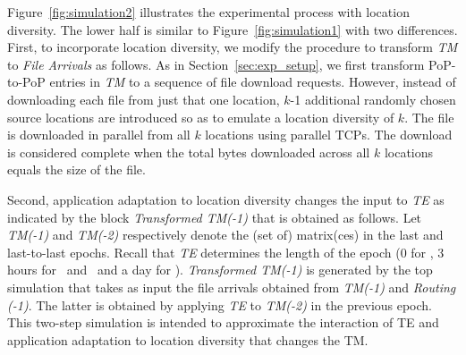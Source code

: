  

Figure~\ref{fig:simulation2} illustrates the experimental process with location diversity. The lower half  is similar to Figure~\ref{fig:simulation1} with two differences. First, to incorporate location diversity, we modify the procedure to transform {\em TM} to {\em File Arrivals} as follows. As in Section~\ref{sec:exp_setup}, we first transform PoP-to-PoP entries in {\em TM} to a sequence of file download requests. However, instead of downloading each file from just that one location, $k$-1  additional randomly chosen source locations are introduced so as to emulate a location diversity of $k$.  The file is downloaded in parallel from all $k$ locations using parallel TCPs. The download is considered complete when the total bytes downloaded across all $k$ locations equals the size of the file.



Second, application adaptation to location diversity changes the input to {\em TE} as indicated by the block \textsl{Transformed TM(-1)} that is  obtained as follows. Let \textsl{TM(-1)} and \textsl{TM(-2)} respectively denote the (set of) matrix(ces) in the last and last-to-last epochs. Recall that {\em TE} determines the length of the epoch (0 for \opt, 3 hours for \optwt\ and \mplsavg\, and a day for \cope). \textsl{Transformed TM(-1)} is generated by the top simulation that takes as input the file arrivals obtained from \textsl{TM(-1)} and {\em Routing (-1)}. The latter is obtained by applying {\em TE} to \textsl{TM(-2)} in the previous epoch. This two-step simulation is intended to approximate the interaction of TE and application adaptation to location diversity that changes the TM. 

